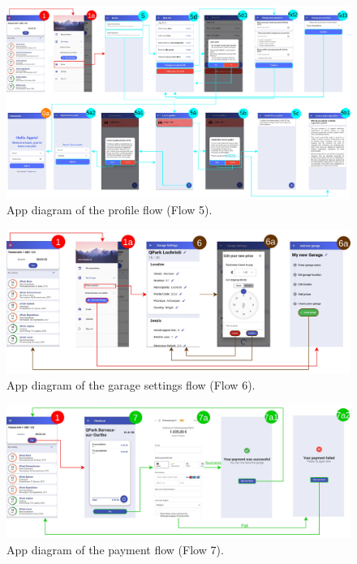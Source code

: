 \clearpage

\begin{figure}[hpt]
    \centering
    \includegraphics[width=16cm]{images/app/app_diagrams/app_diagram-profile-flow.jpg}
    \caption{App diagram of the profile flow (Flow 5).}
    \label{fig:profile-flow}
\end{figure}
\begin{figure}[hpt]
   \centering
   \includegraphics[width=16cm]{images/app/app_diagrams/app_diagram-garage-settings-flow.jpg}
    \caption{App diagram of the garage settings flow (Flow 6).}
   \label{fig:garage-settings-flow}
\end{figure}
\begin{figure}[!hpt]
    \centering
    \includegraphics[width=16cm]{images/app/app_diagrams/app_diagram-payment.jpg}
    \caption{App diagram of the payment flow (Flow 7).}
    \label{fig:payment-flow}
\end{figure}

